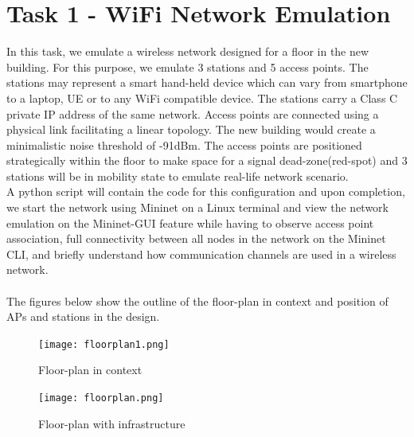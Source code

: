 \documentclass{article}
\begin{document}
\section{Task 1 - WiFi Network Emulation}
In this task, we emulate a wireless network designed for a floor in the new building. For this purpose, we emulate 3 stations and 5 access points. The stations may represent a smart hand-held device which can vary from smartphone to a laptop, UE or to any WiFi compatible device. The stations carry a Class C private IP address of the same network. Access points are connected using a physical link facilitating a linear topology. The new building would create a minimalistic noise threshold of -91dBm. The access points are positioned strategically within the floor to make space for a signal dead-zone(red-spot) and 3 stations will be in mobility state to emulate real-life network scenario. \\ A python script will contain the code for this configuration and upon completion, we start the network using Mininet on a Linux terminal and view the network emulation on the Mininet-GUI feature while having to observe access point association, full connectivity between all nodes in the network on the Mininet CLI, and briefly understand how communication channels are used in a wireless network. \\\\
The figures below show the outline of the floor-plan in context and position of APs and  stations in the design.
    	\begin{figure}[h]
		\centering
        		\texttt{[image: floorplan1.png]}
        		\caption{Floor-plan in context}
        		\label{fig:t1-1}
        		\endminipage
        		\texttt{[image: floorplan.png]}
        		\caption{Floor-plan with infrastructure}
       		\label{fig:t1-2}
       		\endminipage
    	\end{figure} 
\end{document}
